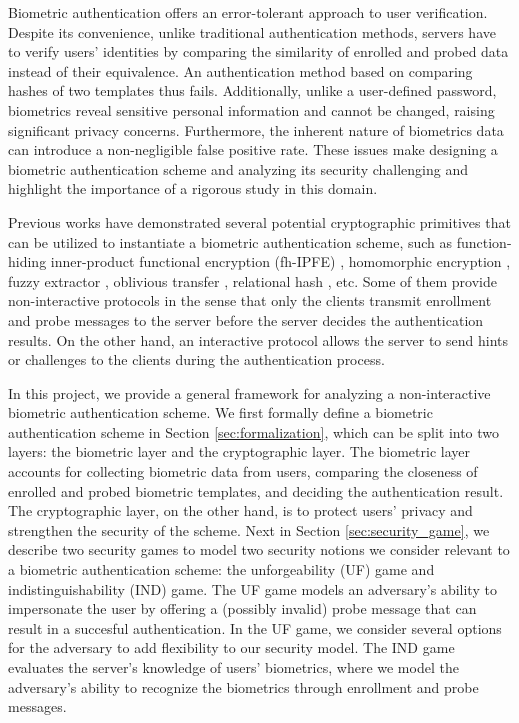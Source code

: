 


Biometric authentication offers an error-tolerant approach to user verification. Despite its convenience, unlike traditional authentication methods, servers have to verify users' identities by comparing the similarity of enrolled and probed data instead of their equivalence. An authentication method based on comparing hashes of two templates thus fails. Additionally, unlike a user-defined password, biometrics reveal sensitive personal information and cannot be changed, raising significant privacy concerns. Furthermore, the inherent nature of biometrics data can introduce a non-negligible false positive rate. These issues make designing a biometric authentication scheme and analyzing its security challenging and highlight the importance of a rigorous study in this domain.

Previous works have demonstrated several potential cryptographic primitives that can be utilized to instantiate a biometric authentication scheme, such as function-hiding inner-product functional encryption (fh-IPFE) \cite{cryptoeprint:2016/440, cryptoeprint:2018/1214,10.1007/978-3-030-90567-5_33, 10.1145/3488932.3497754, cryptoeprint:2023/481}, homomorphic encryption \cite{10.1007/978-3-642-40588-4_5, pradel2021privacypreservingbiometricmatchingusing}, fuzzy extractor \cite{10.1145/1030083.1030096, 7980010}, oblivious transfer \cite{cryptoeprint:2012/586}, relational hash \cite{cryptoeprint:2014/394}, etc. Some of them provide non-interactive protocols in the sense that only the clients transmit enrollment and probe messages to the server before the server decides the authentication results. On the other hand, an interactive protocol allows the server to send hints or challenges to the clients during the authentication process.

In this project, we provide a general framework for analyzing a non-interactive biometric authentication scheme.
We first formally define a biometric authentication scheme in Section \ref{sec:formalization}, which can be split into two layers: the biometric layer and the cryptographic layer.
The biometric layer accounts for collecting biometric data from users, comparing the closeness of enrolled and probed biometric templates, and deciding the authentication result.
The cryptographic layer, on the other hand, is to protect users' privacy and strengthen the security of the scheme.
Next in Section \ref{sec:security_game}, we describe two security games to model two security notions we consider relevant to a biometric authentication scheme: the unforgeability (UF) game and indistinguishability (IND) game. The UF game models an adversary's ability to impersonate the user by offering a (possibly invalid) probe message that can result in a succesful authentication. In the UF game, we consider several options for the adversary to add flexibility to our security model. The IND game evaluates the server's knowledge of users' biometrics, where we model the adversary's ability to recognize the biometrics through enrollment and probe messages.

